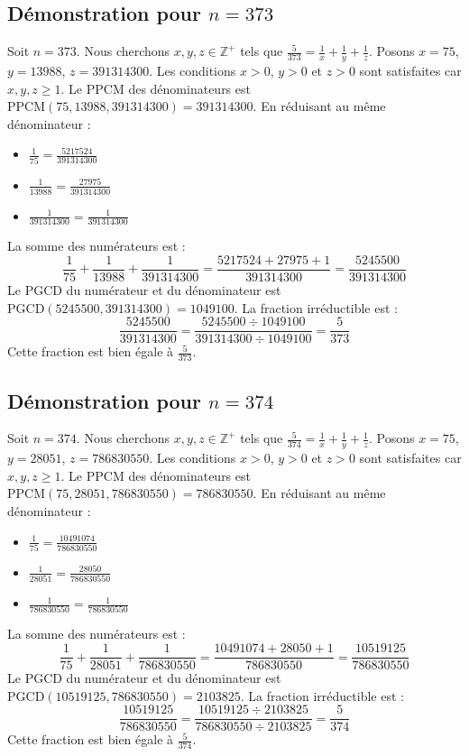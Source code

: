 \documentclass[11pt,a4paper]{article}
\begin{document}
\subsection{Démonstration pour $n = 373$}
Soit $n = 373$. Nous cherchons $x, y, z \in \mathbb{Z}^{+}$ tels que $\frac{5}{373} = \frac{1}{x} + \frac{1}{y} + \frac{1}{z}$.
Posons $x = 75$, $y = 13988$, $z = 391314300$.
Les conditions $x > 0$, $y > 0$ et $z > 0$ sont satisfaites car $x, y, z \geq 1$.
Le PPCM des dénominateurs est $\text{PPCM}(75, 13988, 391314300) = 391314300$.
En réduisant au même dénominateur :
\begin{itemize}
    \item $\frac{1}{75} = \frac{5217524}{391314300}$
    \item $\frac{1}{13988} = \frac{27975}{391314300}$
    \item $\frac{1}{391314300} = \frac{1}{391314300}$
\end{itemize}
La somme des numérateurs est :
$$ \frac{1}{75} + \frac{1}{13988} + \frac{1}{391314300} = \frac{5217524 + 27975 + 1}{391314300} = \frac{5245500}{391314300} $$
Le PGCD du numérateur et du dénominateur est $\text{PGCD}(5245500, 391314300) = 1049100$.
La fraction irréductible est :
$$ \frac{5245500}{391314300} = \frac{5245500 \div 1049100}{391314300 \div 1049100} = \frac{5}{373} $$
Cette fraction est bien égale à $\frac{5}{373}$.

\subsection{Démonstration pour $n = 374$}
Soit $n = 374$. Nous cherchons $x, y, z \in \mathbb{Z}^{+}$ tels que $\frac{5}{374} = \frac{1}{x} + \frac{1}{y} + \frac{1}{z}$.
Posons $x = 75$, $y = 28051$, $z = 786830550$.
Les conditions $x > 0$, $y > 0$ et $z > 0$ sont satisfaites car $x, y, z \geq 1$.
Le PPCM des dénominateurs est $\text{PPCM}(75, 28051, 786830550) = 786830550$.
En réduisant au même dénominateur :
\begin{itemize}
    \item $\frac{1}{75} = \frac{10491074}{786830550}$
    \item $\frac{1}{28051} = \frac{28050}{786830550}$
    \item $\frac{1}{786830550} = \frac{1}{786830550}$
\end{itemize}
La somme des numérateurs est :
$$ \frac{1}{75} + \frac{1}{28051} + \frac{1}{786830550} = \frac{10491074 + 28050 + 1}{786830550} = \frac{10519125}{786830550} $$
Le PGCD du numérateur et du dénominateur est $\text{PGCD}(10519125, 786830550) = 2103825$.
La fraction irréductible est :
$$ \frac{10519125}{786830550} = \frac{10519125 \div 2103825}{786830550 \div 2103825} = \frac{5}{374} $$
Cette fraction est bien égale à $\frac{5}{374}$.
\end{document}
